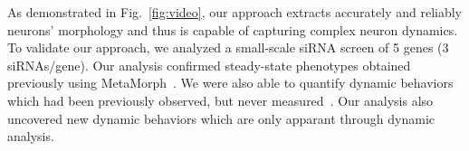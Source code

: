 As   demonstrated  in   Fig.~\ref{fig:video}, 
our  approach extracts accurately and reliably neurons' morphology and thus is capable of capturing
complex  neuron  dynamics. To validate our approach, we analyzed a   
small-scale  siRNA screen  of 5  genes (3  siRNAs/gene). Our analysis
confirmed steady-state phenotypes obtained previously using 
MetaMorph\texttrademark~\cite{Pertz08}. We were also able to
quantify dynamic behaviors which had been previously observed, but never
measured~\cite{Pertz08}. Our  analysis also uncovered
new dynamic behaviors which are only apparant through dynamic analysis.






